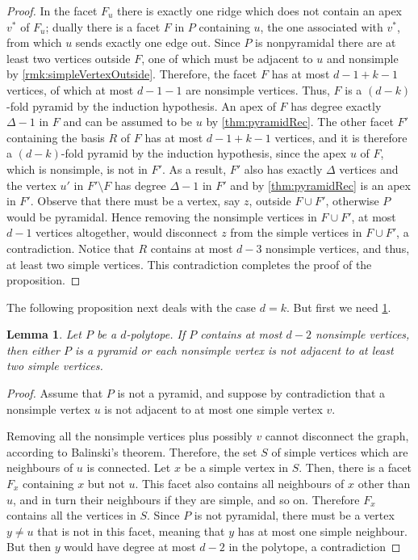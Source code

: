 \documentclass[a4paper]{amsart}
\newtheorem{lemma}[theorem]{Lemma}
\theoremstyle{definition}
\theoremstyle{remark}
\begin{document}
\begin{proof}
In the facet $F_u$ there is exactly one ridge which does not contain an apex $v^*$ of $F_u$; dually there is a facet $F$ in $P$ containing $u$, the one associated with $v^*$,  from which $u$ sends exactly one edge out. Since $P$ is nonpyramidal there are at least two vertices outside $F$, one of which must be adjacent to $u$ and nonsimple by \cref{rmk:simpleVertexOutside}. Therefore, the facet $F$ has at most $d-1+k-1$ vertices, of which at most $d-1-1$ are nonsimple vertices. Thus, $F$ is a $(d-k)$-fold pyramid by the induction hypothesis. An apex of $F$ has degree exactly ${\Delta}-1$ in $F$ and can be assumed to be $u$ by \cref{thm:pyramidRec}. The other facet $F'$ containing the basis $R$ of $F$ has at most $d-1+k-1$ vertices, and it is therefore a $(d-k)$-fold pyramid by the induction hypothesis, since the apex $u$ of $F$, which is nonsimple, is not in $F'$. As a result, $F'$ also has exactly ${\Delta}$ vertices and the vertex $u'$ in $F'\setminus F$ has degree ${\Delta}-1$ in $F'$ and by \cref{thm:pyramidRec} is an apex in $F'$.  Observe that there must be a vertex, say $z$, outside $F\cup F'$, otherwise $P$ would be pyramidal. Hence removing the nonsimple vertices in $F\cup F'$, at most $d-1$ vertices altogether, would disconnect $z$ from the simple vertices in $F\cup F'$, a contradiction. Notice that $R$ contains at most $d-3$ nonsimple vertices, and thus, at least two simple vertices.  This contradiction completes the proof of the proposition. 
    \end{proof}
  
The following proposition next deals with the case $d=k$. But first we need \cref{lem:pyrOrSimpleVert}.  

\begin{lemma}\label{lem:pyrOrSimpleVert}
Let $P$ be a $d$-polytope. If $P$ contains at most $d-2$ nonsimple vertices, then either $P$ is a pyramid or each nonsimple vertex is not adjacent to at least two simple vertices. 
\end{lemma}

\begin{proof}
Assume that $P$ is not a pyramid, and suppose by contradiction that a nonsimple vertex $u$ is not adjacent to at most one simple vertex $v$.

Removing all the nonsimple vertices plus possibly $v$ cannot disconnect the graph, according to Balinski's theorem. Therefore, the set $S$ of simple vertices which are neighbours of $u$ is connected. Let $x$ be a simple vertex in $S$. Then, there is a facet $F_x$ containing $x$ but not $u$. This facet also contains all neighbours of $x$ other than $u$, and in turn their neighbours if they are simple, and so on. Therefore $F_x$ contains all the  vertices in $S$. Since $P$ is not pyramidal, there must be a vertex $y\ne u$ that is not in this facet, meaning that $y$ has at most one simple neighbour. But then $y$ would have degree at most $d-2$ in the polytope, a contradiction 
\end{proof}
      
\end{document}
